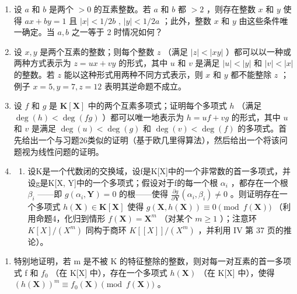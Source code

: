 \begin{enumerate}
\def\labelenumi{\arabic{enumi})}
\setcounter{enumi}{24}
\item
  设 \(a\) 和 \(b\) 是两个 \(> 0\) 的互素整数。若 \(a\) 和 \(b\) 都 \(> 2\) ，则存在整数 \(x\) 和 \(y\) 使得 \(ax + by = 1\) 且 \(|x| < 1/2b\) , \(|y| < 1/2a\) ；此外，整数 \(x\) 和 \(y\) 由这些条件唯一确定。当 \(a, b\) 之一等于 2 时情况如何？
\item
  设 \(x, y\) 是两个互素的整数；则每个整数 \(z\) （满足 \(|z| < |xy|\) ）都可以以一种或两种方式表示为 \(z = ux + vy\) 的形式，其中 \(u\) 和 \(v\) 是满足 \(|u| < |y|\) 和 \(|v| < |x|\) 的整数。若 \(z\) 能以这种形式用两种不同方式表示，则 \(x\) 和 \(y\) 都不能整除 \(z\) ；例子 \(x = 5, y = 7, z = 12\) 表明其逆命题不成立。
\item
  设 \(f\) 和 \(g\) 是 \(\mathbf{K}[\mathbf{X}]\) 中的两个互素多项式；证明每个多项式 \(h\) （满足 \(\deg(h) < \deg(fg)\) ）都可以唯一地表示为 \(h = uf + vg\) 的形式，其中 \(u\) 和 \(v\) 是满足 \(\deg(u) < \deg(g)\) 和 \(\deg(v) < \deg(f)\) 的多项式。首先给出一个与习题26类似的证明（基于欧几里得算法），然后给出一个将该问题视为线性问题的证明。
\item
  \begin{enumerate}
  \def\labelenumii{\alph{enumii})}
  \tightlist
  \item
    设K是一个代数闭的交换域，设f是K{[}X{]}中的一个非常数的首一多项式，并设g是K{[}X, Y{]}中的一个多项式；假设对于f的每一个根 \(\alpha_{i}\) ，都存在一个根 \(\beta_{i}\) ——即 \(g(\alpha_{i}, \mathbf{Y}) = 0\) 的根——使得 \(\frac{\partial g}{\partial \mathbf{Y}} (\alpha_{i}, \beta_{i}) \neq 0\) 。则证明存在一个多项式 \(h(\mathbf{X}) \in \mathbf{K}[\mathbf{X}]\) 使得 \(g(\mathbf{X}, h(\mathbf{X})) \equiv 0 \pmod{f(\mathbf{X})}\) （利用命题4，化归到情形 \(f(\mathbf{X}) = \mathbf{X}^{m}\) （对某个 \(m \geqslant 1\) ）；注意环 \(K[X]/(X^{m})\) 同构于商环 \(K[[X]]/(X^{m})\) ，并利用 IV 第 37 页的推论）。
  \end{enumerate}
\end{enumerate}

\begin{enumerate}
\def\labelenumi{\alph{enumi})}
\setcounter{enumi}{1}
\tightlist
\item
  特别地证明，若 m 是不被 K 的特征整除的整数，则对每一对互素的首一多项式 f 和 \(f_{0}\) （在 K{[}X{]} 中），存在一个多项式 \(h(\mathbf{X})\) （在 K{[}X{]} 中），使得 \((h(\mathbf{X}))^{m} \equiv f_{0}(\mathbf{X}) \pmod{f(\mathbf{X})}\) 。
\end{enumerate}

